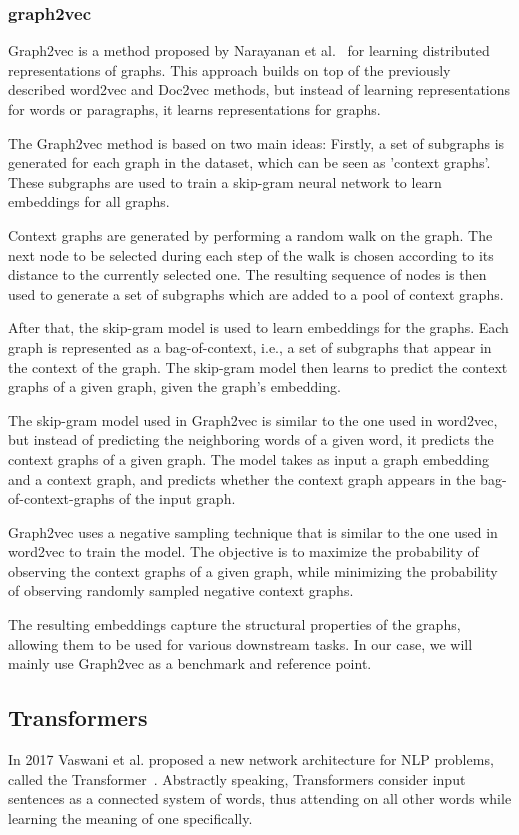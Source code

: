 \subsubsection{graph2vec}
Graph2vec is a method proposed by Narayanan et al.~\cite{2017graph2vec} for learning distributed representations of graphs. This approach builds on top of the previously described word2vec and Doc2vec methods, but instead of learning representations for words or paragraphs, it learns representations for graphs.

The Graph2vec method is based on two main ideas: Firstly, a set of subgraphs is generated for each graph in the dataset, which can be seen as 'context graphs'. These subgraphs are used to train a skip-gram neural network to learn embeddings for all graphs.

Context graphs are generated by performing a random walk on the graph. The next node to be selected during each step of the walk is chosen according to its distance to the currently selected one. The resulting sequence of nodes is then used to generate a set of subgraphs which are added to a pool of context graphs.

After that, the skip-gram model is used to learn embeddings for the graphs. Each graph is represented as a bag-of-context, i.e., a set of subgraphs that appear in the context of the graph. The skip-gram model then learns to predict the context graphs of a given graph, given the graph's embedding.

The skip-gram model used in Graph2vec is similar to the one used in word2vec, but instead of predicting the neighboring words of a given word, it predicts the context graphs of a given graph. The model takes as input a graph embedding and a context graph, and predicts whether the context graph appears in the bag-of-context-graphs of the input graph.

Graph2vec uses a negative sampling technique that is similar to the one used in word2vec to train the model. The objective is to maximize the probability of observing the context graphs of a given graph, while minimizing the probability of observing randomly sampled negative context graphs.

The resulting embeddings capture the structural properties of the graphs, allowing them to be used for various downstream tasks. In our case, we will mainly use Graph2vec as a benchmark and reference point.

\subsection{Transformers}
In 2017 Vaswani et al. proposed a new network architecture for NLP problems, called the Transformer~\cite{vaswani2017attention}. Abstractly speaking, Transformers consider input sentences as a connected system of words, thus attending on all other words while learning the meaning of one specifically.

